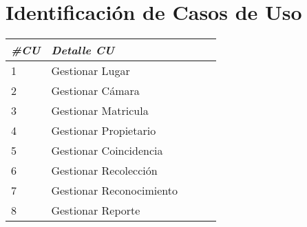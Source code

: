 \section{Identificación de Casos de Uso}
\begin{tabular}{@{} *5l @{}}    \toprule
\emph{\#CU} & \emph{Detalle CU} \\ \midrule
 1 & Gestionar Lugar \\ 
 2 & Gestionar Cámara \\ 
 3 & Gestionar Matricula \\ 
 4 & Gestionar Propietario \\ 
 5 & Gestionar Coincidencia \\ 
 6 & Gestionar Recolección \\ 
 7 & Gestionar Reconocimiento \\ 
 8 & Gestionar Reporte \\ \bottomrule
 \hline
\end{tabular}

